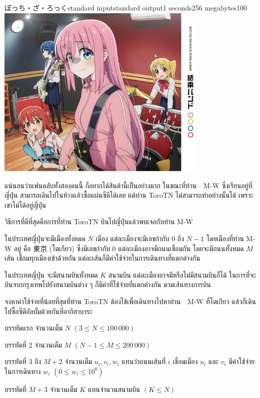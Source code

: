 \documentclass[11pt,a4paper]{article}
\begin{document}
\begin{problem}{ぼっち・ざ・ろっく}{standard input}{standard output}{1 seconds}{256 megabytes}{100}
\includegraphics[width=10cm]{04-bocchitherock/kessoku-album.jpg}

แน่นอนว่าแฟนคลับทั้งสองคนนี้ ก็อยากได้สินค้านี้เป็นอย่างมาก ในขณะที่ท่าน　M-W ซึ่งเรียนอยู่ที่ญี่ปุ่น สามารถเดินไปในห้างแล้วซื้อแผ่นซีดีได้เลย แต่ท่าน ToroTN ไม่สามารถทำอย่างนั้นได้ เพราะเขาไม่ได้อยู่ญี่ปุ่น

วิธีการที่ดีที่สุดคือการที่ท่าน ToroTN บินไปญี่ปุ่นแล้วพบเจอกับท่าน M-W

ในประเทศญี่ปุ่นจะมีเมืองทั้งหมด $N$ เมือง แต่ละเมืองจะมีเลขกำกับ $0$ ถึง $N-1$ โดยเมืองที่ท่าน M-W อยู่ คือ  東京 (โตเกียว) ซึ่งมีเลขกำกับ $0$ แต่ละเมืองอาจมีถนนเชื่อมกัน โดยจะมีถนนทั้งหมด $M$ เส้น เชื่อมทุกเมืองเข้าด้วยกัน แต่ละเส้นก็มีค่าใช้จ่ายในการเดินทางที่แตกต่างกัน

ในประเทศญี่ปุ่น จะมีสนามบินทั้งหมด $K$ สนามบิน แต่ละเมืองอาจมีหรือไม่มีสนามบินก็ได้ ในการที่จะบินจากกรุงเทพไปยังสนามบินต่าง ๆ ก็มีค่าที่ใช้จ่ายที่แตกต่างกัน ตามเส้นทางการบิน

\YourWork

จงหาค่าใช้จ่ายที่น้อยที่สุดที่ท่าน ToroTN ต้องใช้เพื่อเดินทางไปหาท่าน　M-W ที่โตเกียว แล้วก็เดินไปซื้อซีดีอัลบั้มด้วยกันที่อากิฮาบาระ

\pagebreak

\InputFile

บรรทัดแรก จำนวนเต็ม $N$ $(3 \leq N \leq 100\,000)$

บรรทัดที่ $2$ จำนวนเต็ม $M$ $(N - 1 \leq M \leq 200\,000)$

บรรทัดที่ $3$ ถึง $M+2$ จำนวนเต็ม $u_i, v_i, w_i$ แทนว่าถนนเส้นที่ $i$ เชื่อมเมือง $u_i$ และ $v_i$ มีค่าใช้จ่ายในการเดินทาง $w_i$ $(0 \leq w_i \leq 10^6)$

บรรทัดที่ $M+3$ จำนวนเต็ม $K$ แทนจำนวนสนามบิน $(K \leq N)$


\end{problem}
\end{document}
